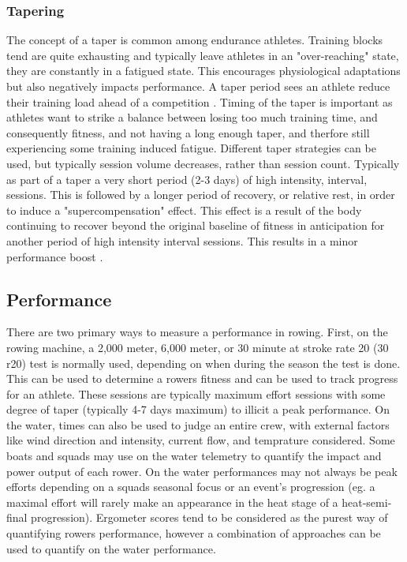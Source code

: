 \subsubsection{Tapering}
The concept of a taper is common among endurance athletes. Training blocks tend are quite exhausting and typically leave athletes in an "over-reaching" state, they are constantly in a fatigued state. This encourages physiological adaptations but also negatively impacts performance. A taper period sees an athlete reduce their training load ahead of a competition \cite{Lawton2023}. Timing of the taper is important as athletes want to strike a balance between losing too much training time, and consequently fitness, and not having a long enough taper, and therfore still experiencing some training induced fatigue. Different taper strategies can be used, but typically session volume decreases, rather than session count. Typically as part of a taper a very short period (2-3 days) of high intensity, interval, sessions. This is followed by a longer period of recovery, or relative rest, in order to induce a "supercompensation" effect. This effect is a result of the body continuing to recover beyond the original baseline of fitness in anticipation for another period of high intensity interval sessions. This results in a minor performance boost \cite{Kanwetz2016}.


\subsection{Performance}
There are two primary ways to measure a performance in rowing. First, on the rowing machine, a 2,000 meter, 6,000 meter, or 30 minute at stroke rate 20 (30 r20) test is normally used, depending on when during the season the test is done. This can be used to determine a rowers fitness and can be used to track progress for an athlete. These sessions are typically maximum effort sessions with some degree of taper (typically 4-7 days maximum) to illicit a peak performance. On the water, times can also be used to judge an entire crew, with external factors like wind direction and intensity, current flow, and temprature considered. Some boats and squads may use on the water telemetry to quantify the impact and power output of each rower. On the water performances may not always be peak efforts depending on a squads seasonal focus or an event's progression (eg. a maximal effort will rarely make an appearance in the heat stage of a heat-semi-final progression). Ergometer scores tend to be considered as the purest way of quantifying rowers performance, however a combination of approaches can be used to quantify on the water performance.

